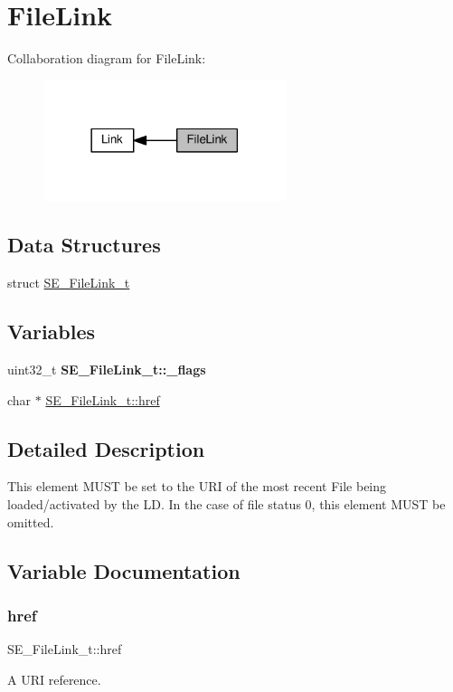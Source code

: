 \hypertarget{group__FileLink}{}\section{File\+Link}
\label{group__FileLink}
Collaboration diagram for File\+Link\+:\nopagebreak
\begin{figure}[H]
\begin{center}
\leavevmode
\includegraphics[width=201pt]{group__FileLink}
\end{center}
\end{figure}
\subsection*{Data Structures}
\begin{DoxyCompactItemize}
\item 
struct \hyperlink{structSE__FileLink__t}{S\+E\+\_\+\+File\+Link\+\_\+t}
\end{DoxyCompactItemize}
\subsection*{Variables}
\begin{DoxyCompactItemize}
\item 
\mbox{\label{group__FileLink_gaf13e42f29178c7b0f26ba48ddd0ae167}} 
uint32\+\_\+t {\bfseries S\+E\+\_\+\+File\+Link\+\_\+t\+::\+\_\+flags}
\item 
char $\ast$ \hyperlink{group__FileLink_ga31ea315596bf5ba69f99332a09616b38}{S\+E\+\_\+\+File\+Link\+\_\+t\+::href}
\end{DoxyCompactItemize}


\subsection{Detailed Description}
This element M\+U\+ST be set to the U\+RI of the most recent File being loaded/activated by the LD. In the case of file status 0, this element M\+U\+ST be omitted. 

\subsection{Variable Documentation}
\mbox{\label{group__FileLink_ga31ea315596bf5ba69f99332a09616b38}} 
\subsubsection{\texorpdfstring{href}{href}}
{\footnotesize\ttfamily S\+E\+\_\+\+File\+Link\+\_\+t\+::href}

A U\+RI reference. 